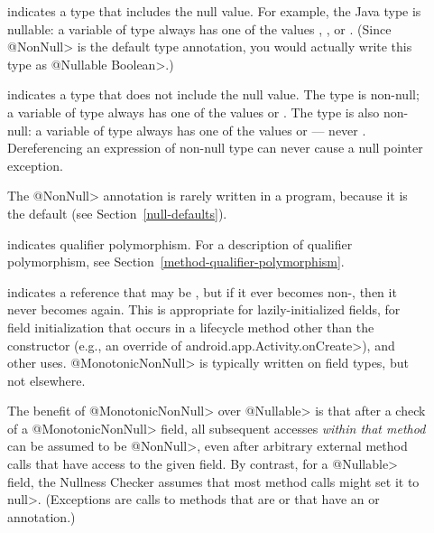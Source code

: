 \begin{description}

\item[]
  indicates a type that includes the null value.  For example, the Java
  type 
  is nullable:  a variable of type  always has one of the
  values , , or .
  (Since \<@NonNull> is the default type annotation, you would actually
  write this type as \<@Nullable Boolean>.)

\item[]
  indicates a type that does not include the null value.  The type
   is non-null; a variable of type  always has
  one of the values  or .  The type  is also non-null:  a variable of type 
  always has one of the values  or  --- never
  .  Dereferencing an expression of non-null type can never cause
  a null pointer exception.

  The \<@NonNull> annotation is rarely written in a program, because it is
  the default (see Section~\ref{null-defaults}).

\item[]
  indicates qualifier polymorphism.
  For a description of qualifier polymorphism, see
  Section~\ref{method-qualifier-polymorphism}.

\item[]
  indicates a reference that may be , but if it ever becomes
  non-, then it never becomes  again.  This is
  appropriate for lazily-initialized fields, for field initialization that
  occurs in a lifecycle method other than the constructor (e.g., an
  override of \<android.app.Activity.onCreate>), and other uses.
  \<@MonotonicNonNull> is typically written on field types, but not elsewhere.

  \begin{sloppypar}
  The benefit of \<@MonotonicNonNull> over \<@Nullable> is that after a
  check of a \<@MonotonicNonNull> field, all subsequent accesses
  \emph{within that method} can be assumed to be \<@NonNull>, even after
  arbitrary external method calls that have access to the given field.
  By contrast, for a \<@Nullable> field, the Nullness Checker assumes that
  most method calls might set it to \<null>. (Exceptions are calls to
  methods that are  or that
  have an  or
   annotation.)
  \end{sloppypar}


\end{description}
